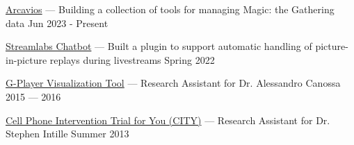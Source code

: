 \href{https://github.com/arcavios}{Arcavios} --- Building a collection of tools for managing Magic: the Gathering data  \hfill Jun 2023 - Present

\href{https://github.com/iambroadband/auto-instant-replay}{Streamlabs Chatbot} --- Built a plugin to support automatic handling of picture-in-picture replays during livestreams    \hfill Spring 2022

\href{https://github.com/spacial-player-data-visualization/g-player-visualization}{G-Player Visualization Tool} --- Research Assistant for Dr. Alessandro Canossa   \hfill 2015 --- 2016

\href{https://www.mhealthgroup.org/projects.html}{Cell Phone Intervention Trial for You (CITY)} --- Research Assistant for Dr. Stephen Intille  \hfill Summer 2013
